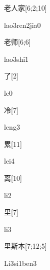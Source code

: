 \begin{verbete}{老人家}[6;2;10]
\begin{pronuncia}{lao3ren2jia0}
\end{pronuncia}
\end{verbete}

\begin{verbete}{老师}[6;6]
\begin{pronuncia}{lao3shi1}
\end{pronuncia}
\end{verbete}

\begin{verbete}[le0]{了}[2]
\begin{pronuncia}{le0}
\end{pronuncia}
\end{verbete}

\begin{verbete}[leng3]{冷}[7]
\begin{pronuncia}{leng3}
\end{pronuncia}
\end{verbete}

\begin{verbete}[lei4]{累}[11]
\begin{pronuncia}{lei4}
\end{pronuncia}
\end{verbete}

\begin{verbete}[li2]{离}[10]
\begin{pronuncia}{li2}
\end{pronuncia}
\end{verbete}

\begin{verbete}[li3]{里}[7]
\begin{pronuncia}{li3}
\end{pronuncia}
\end{verbete}

\begin{verbete}[Li3si1ben3]{里斯本}[7;12;5]
\begin{pronuncia}{Li3si1ben3}
\end{pronuncia}
\end{verbete}

